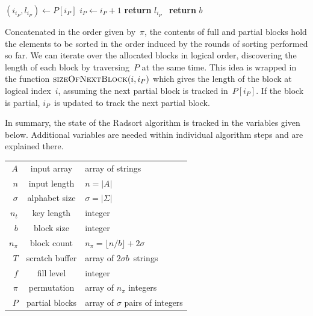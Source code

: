 \documentclass[nolineno,a4paper,UKenglish,cleveref, autoref, thm-restate]{socg-lipics-v2021}
\begin{document}
\begin{algorithm}
\caption{finding the size of the next block} \label{alg:blocksize}
\begin{algorithmic}[1]
\State$(i_{i_P},l_{i_P})\gets P[i_P]$
 \State$i_P\gets i_P+1$
 \State\textbf{return} $l_{i_P}$
\Else\ \textbf{return} $b$
\EndIf
\EndFunction
\end{algorithmic}
\end{algorithm}

Concatenated in the order given by~$\pi$, the contents of full and partial
blocks hold the elements to be sorted in the order induced by the
rounds of sorting performed so far.
We can iterate over the allocated blocks in logical order, discovering the
length of each block by traversing~$P$ at the same time.  This idea is wrapped in the
function $\Call{sizeOfNextBlock}{i,i_P}$ which gives the length of the block at logical index~$i$,
assuming the next partial block is tracked in~$P[i_P]$.  If the block is partial, $i_P$~is
updated to track the next partial block.

In summary, the state of the Radsort algorithm is tracked in the
variables given below.
Additional variables are needed within individual algorithm
steps and are explained there.

\vspace{\abovedisplayskip}
\begin{centering}
\begin{tabular*}{\textwidth}{rcl}
\toprule
$A$&input array&array of strings\\
$n$&input length&$n=|A|$\\
$\sigma$&alphabet size&$\sigma=|\Sigma|$\\
$n_t$&key length&integer\\
$b$&block size&integer\\
$n_\pi$&block count&$n_\pi=\lfloor n/b\rfloor +2\sigma$\\
$T$&scratch buffer&array of $2\sigma b$~strings\\
$f$&fill level&integer\\
$\pi$&permutation&array of $n_\pi$ integers\\
$P$&partial blocks&array of $\sigma$ pairs of integers\\
\bottomrule
\end{tabular*}
\end{centering}
\end{document}

